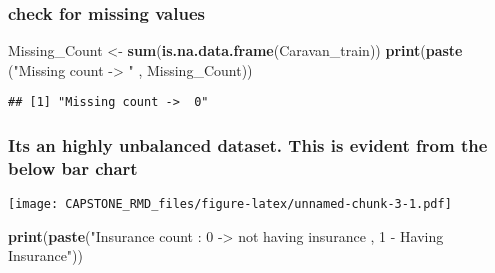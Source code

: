 \documentclass[]{article}
\newenvironment{Shaded}{\begin{snugshade}}{\end{snugshade}}
\newcommand{\KeywordTok}[1]{\textcolor[rgb]{0.13,0.29,0.53}{\textbf{#1}}}
\newcommand{\DataTypeTok}[1]{\textcolor[rgb]{0.13,0.29,0.53}{#1}}
\newcommand{\StringTok}[1]{\textcolor[rgb]{0.31,0.60,0.02}{#1}}
\newcommand{\CommentTok}[1]{\textcolor[rgb]{0.56,0.35,0.01}{\textit{#1}}}
\newcommand{\OperatorTok}[1]{\textcolor[rgb]{0.81,0.36,0.00}{\textbf{#1}}}
\newcommand{\NormalTok}[1]{#1}
\begin{document}
\subsubsection{check for missing values}\label{check-for-missing-values}

\begin{Shaded}
\begin{Highlighting}[]
\NormalTok{Missing_Count <-}\StringTok{  }\KeywordTok{sum}\NormalTok{(}\KeywordTok{is.na.data.frame}\NormalTok{(Caravan_train))}
\KeywordTok{print}\NormalTok{(}\KeywordTok{paste}\NormalTok{ (}\StringTok{"Missing count -> "}\NormalTok{ , Missing_Count))}
\end{Highlighting}
\end{Shaded}

\begin{verbatim}
## [1] "Missing count ->  0"
\end{verbatim}

\subsubsection{Its an highly unbalanced dataset. This is evident from
the below bar
chart}\label{its-an-highly-unbalanced-dataset.-this-is-evident-from-the-below-bar-chart}

\begin{Shaded}
\end{Shaded}

\texttt{[image: CAPSTONE\_RMD\_files/figure-latex/unnamed-chunk-3-1.pdf]}

\begin{Shaded}
\begin{Highlighting}[]
\KeywordTok{print}\NormalTok{(}\KeywordTok{paste}\NormalTok{(}\StringTok{"Insurance count : 0 -> not having insurance , 1 - Having Insurance"}\NormalTok{))}
\end{Highlighting}
\end{Shaded}
\end{document}
